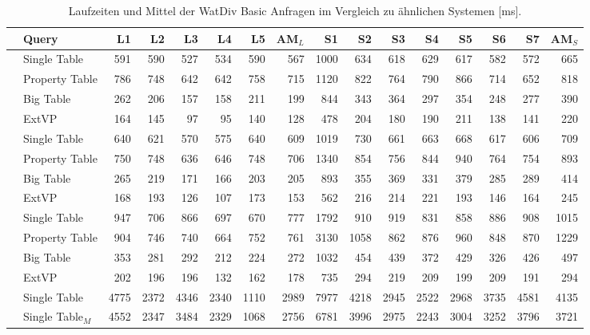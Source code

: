 \documentclass[
  a4paper,
  12pt,
  oneside,
  parskip=half,
  headsepline,
]{scrartcl}
\begin{document}
\setlength{\tabcolsep}{2.5pt}
\begin{table*}[htb]
	\centering
	\tiny
 	\caption{Laufzeiten und Mittel der WatDiv Basic Anfragen im Vergleich zu ähnlichen Systemen [ms].}
  	\label{tab:runtime:watdiv:basic}
	\begin{tabular*}{\textwidth}{ ll @{\extracolsep{\fill}} rrrrrrrrrrrrrr }
		\toprule
		& Query & L1 & L2 & L3 & L4 & L5 & AM$_L$ & S1 & S2 & S3 & S4 & S5 & S6 & S7 & AM$_S$ \\
		\midrule
		\multirow{4}{*}{\rotatebox{90}{SF10}}
		& Single Table & 591 & 590 & 527 & 534 & 590 & 567 & 1000 & 634 & 618 & 629 & 617 & 582 & 572 & 665 \\
		& Property Table & 786 & 748 & 642 & 642 & 758 & 715 & 1120 & 822 & 764 & 790 & 866 & 714 & 652 & 818 \\
		& Big Table & 262 & 206 & 157 & 158 & 211 & 199 & 844 & 343 & 364 & 297 & 354 & 248 & 277 & 390 \\
		& ExtVP & 164 & 145 & 97 & 95 & 140 & 128 & 478 & 204 & 180 & 190 & 211 & 138 & 141 & 220 \\
		\midrule
		\multirow{4}{*}{\rotatebox{90}{SF100}}
		& Single Table & 640 & 621 & 570 & 575 & 640 & 609 & 1019 & 730 & 661 & 663 & 668 & 617 & 606 & 709 \\
		& Property Table & 750 & 748 & 636 & 646 & 748 & 706 & 1340 & 854 & 756 & 844 & 940 & 764 & 754 & 893 \\
		& Big Table & 265 & 219 & 171 & 166 & 203 & 205 & 893 & 355 & 369 & 331 & 379 & 285 & 289 & 414 \\
		& ExtVP & 168 & 193 & 126 & 107 & 173 & 153 & 562 & 216 & 214 & 221 & 193 & 146 & 164 & 245 \\
		\midrule
		\multirow{4}{*}{\rotatebox{90}{SF1000}}
		& Single Table & 947 & 706 & 866 & 697 & 670 & 777 & 1792 & 910 & 919 & 831 & 858 & 886 & 908 & 1015 \\
		& Property Table & 904 & 746 & 740 & 664 & 752 & 761 & 3130 & 1058 & 862 & 876 & 960 & 848 & 870 & 1229 \\
		& Big Table & 353 & 281 & 292 & 212 & 224 & 272 & 1032 & 454 & 439 & 372 & 429 & 326 & 426 & 497 \\
		& ExtVP & 202 & 196 & 196 & 132 & 162 & 178 & 735 & 294 & 219 & 209 & 199 & 209 & 191 & 294 \\
		\midrule
		\multirow{7}{*}{\rotatebox{90}{SF10000}}
		& Single Table & 4775 & 2372 & 4346 & 2340 & 1110 & 2989 & 7977 & 4218 & 2945 & 2522 & 2968 & 3735 & 4581 & 4135 \\
		& Single Table$_M$ & 4552 & 2347 & 3484 & 2329 & 1068 & 2756 & 6781 & 3996 & 2975 & 2243 & 3004 & 3252 & 3796 & 3721 \\

\end{tabular*}
\end{table*}
\end{document}

